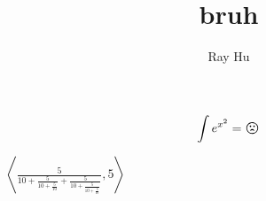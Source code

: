 \documentclass[12pt]{article}
\title{bruh}
\author{Ray Hu}
\date{}
\newcommand{\ang}[1]{\left\langle #1 \right\rangle}
\theoremstyle{definition}
\begin{document}
\maketitle
\doublespacing

\[\int e^{x^2} = \Large{\raisebox{-0.25ex}{\frownie}}\]

\(\ang{\frac{5}{10 + \frac{5}{10 + \frac{5}{10}} + \frac{5}{10 + \frac{5}{10 + \frac{5}{10}}}}, 5}\)
\end{document}
